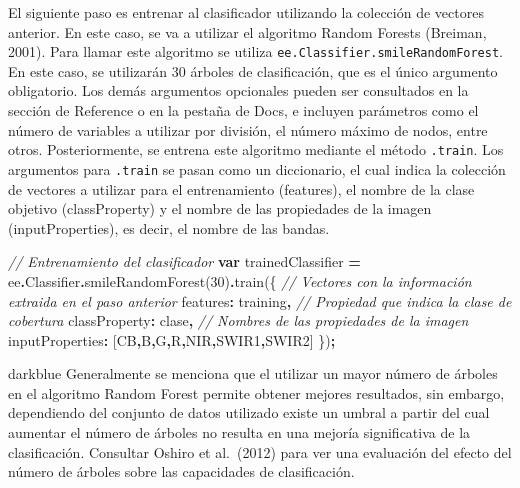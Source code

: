 \documentclass[
  12pt,
  letterpaper,
  twoside]{book}
\newenvironment{Shaded}{\begin{snugshade}}{\end{snugshade}}
\newcommand{\AttributeTok}[1]{\textcolor[rgb]{0.77,0.63,0.00}{#1}}
\newcommand{\CommentTok}[1]{\textcolor[rgb]{0.56,0.35,0.01}{\textit{#1}}}
\newcommand{\DataTypeTok}[1]{\textcolor[rgb]{0.13,0.29,0.53}{#1}}
\newcommand{\DecValTok}[1]{\textcolor[rgb]{0.00,0.00,0.81}{#1}}
\newcommand{\FunctionTok}[1]{\textcolor[rgb]{0.00,0.00,0.00}{#1}}
\newcommand{\KeywordTok}[1]{\textcolor[rgb]{0.13,0.29,0.53}{\textbf{#1}}}
\newcommand{\NormalTok}[1]{#1}
\newcommand{\OperatorTok}[1]{\textcolor[rgb]{0.81,0.36,0.00}{\textbf{#1}}}
\newcommand{\StringTok}[1]{\textcolor[rgb]{0.31,0.60,0.02}{#1}}
\begin{document}
El siguiente paso es entrenar al clasificador utilizando la colección de vectores anterior. En este caso, se va a utilizar el algoritmo Random Forests (Breiman, 2001). Para llamar este algoritmo se utiliza \texttt{ee.Classifier.smileRandomForest}. En este caso, se utilizarán 30 árboles de clasificación, que es el único argumento obligatorio. Los demás argumentos opcionales pueden ser consultados en la sección de Reference o en la pestaña de Docs, e incluyen parámetros como el número de variables a utilizar por división, el número máximo de nodos, entre otros. Posteriormente, se entrena este algoritmo mediante el método \texttt{.train}. Los argumentos para \texttt{.train} se pasan como un diccionario, el cual indica la colección de vectores a utilizar para el entrenamiento (features), el nombre de la clase objetivo (classProperty) y el nombre de las propiedades de la imagen (inputProperties), es decir, el nombre de las bandas.

\begin{Shaded}
\begin{Highlighting}[]
\CommentTok{// Entrenamiento del clasificador}
\KeywordTok{var}\NormalTok{ trainedClassifier }\OperatorTok{=}\NormalTok{ ee}\OperatorTok{.}\AttributeTok{Classifier}\OperatorTok{.}\FunctionTok{smileRandomForest}\NormalTok{(}\DecValTok{30}\NormalTok{)}\OperatorTok{.}\FunctionTok{train}\NormalTok{(\{}
  \CommentTok{// Vectores con la información extraida en el paso anterior}
  \DataTypeTok{features}\OperatorTok{:}\NormalTok{ training}\OperatorTok{,}
  \CommentTok{// Propiedad que indica la clase de cobertura}
  \DataTypeTok{classProperty}\OperatorTok{:} \StringTok{\textquotesingle{}clase\textquotesingle{}}\OperatorTok{,}
  \CommentTok{// Nombres de las propiedades de la imagen}
  \DataTypeTok{inputProperties}\OperatorTok{:}\NormalTok{ [}\StringTok{\textquotesingle{}CB\textquotesingle{}}\OperatorTok{,}\StringTok{\textquotesingle{}B\textquotesingle{}}\OperatorTok{,}\StringTok{\textquotesingle{}G\textquotesingle{}}\OperatorTok{,}\StringTok{\textquotesingle{}R\textquotesingle{}}\OperatorTok{,}\StringTok{\textquotesingle{}NIR\textquotesingle{}}\OperatorTok{,}\StringTok{\textquotesingle{}SWIR1\textquotesingle{}}\OperatorTok{,}\StringTok{\textquotesingle{}SWIR2\textquotesingle{}}\NormalTok{]}
\NormalTok{\})}\OperatorTok{;}
\end{Highlighting}
\end{Shaded}

\begin{bluebox2}

\begin{awesomeblock}{5pt}{\faLightbulb}{darkblue}
Generalmente se menciona que el utilizar un mayor número de árboles en el algoritmo Random Forest permite obtener mejores resultados, sin embargo, dependiendo del conjunto de datos utilizado existe un umbral a partir del cual aumentar el número de árboles no resulta en una mejoría significativa de la clasificación. Consultar Oshiro et al.~(2012) para ver una evaluación del efecto del número de árboles sobre las capacidades de clasificación.

\end{awesomeblock}

\end{bluebox2}
\end{document}
